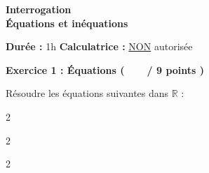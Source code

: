 \documentclass[12pt,a4paper]{exam}
\begin{document}
\begin{center}
    \Large\textbf{Interrogation\\Équations et inéquations}
\end{center}

\vspace{0.3cm}

\noindent
\textbf{Durée :} 1h \hfill
\textbf{Calculatrice :} \underline{NON} autorisée

\vspace{0.5cm}

\noindent
\textbf{Exercice 1 : Équations (\ \ \ \  / 9 points )}
\vspace{5pt}

\begin{questions}

\question[1] Résoudre les équations suivantes dans $\mathbb{R}$ :
\begin{multicols}{2}
\end{multicols}
\begin{multicols}{2}
\end{multicols}
\begin{multicols}{2}
\end{multicols}

\end{questions}
\end{document}
